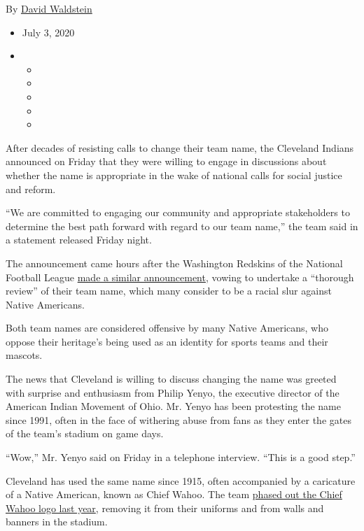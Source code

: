 By \href{https://www.nytimes.com/by/david-waldstein}{David Waldstein}

\begin{itemize}
\item
  July 3, 2020
\item
  \begin{itemize}
  \item
  \item
  \item
  \item
  \item
  \end{itemize}
\end{itemize}

After decades of resisting calls to change their team name, the
Cleveland Indians announced on Friday that they were willing to engage
in discussions about whether the name is appropriate in the wake of
national calls for social justice and reform.

``We are committed to engaging our community and appropriate
stakeholders to determine the best path forward with regard to our team
name,'' the team said in a statement released Friday night.

The announcement came hours after the Washington Redskins of the
National Football League
\href{https://www.nytimes.com/2020/07/03/sports/football/washington-redskins-nickname-nfl.html}{made
a similar announcement}, vowing to undertake a ``thorough review'' of
their team name, which many consider to be a racial slur against Native
Americans.

Both team names are considered offensive by many Native Americans, who
oppose their heritage's being used as an identity for sports teams and
their mascots.

The news that Cleveland is willing to discuss changing the name was
greeted with surprise and enthusiasm from Philip Yenyo, the executive
director of the American Indian Movement of Ohio. Mr. Yenyo has been
protesting the name since 1991, often in the face of withering abuse
from fans as they enter the gates of the team's stadium on game days.

``Wow,'' Mr. Yenyo said on Friday in a telephone interview. ``This is a
good step.''

Cleveland has used the same name since 1915, often accompanied by a
caricature of a Native American, known as Chief Wahoo. The team
\href{https://www.nytimes.com/2018/04/09/sports/baseball/cleveland-indians-chief-wahoo-protests.html}{phased
out the Chief Wahoo logo last year}, removing it from their uniforms and
from walls and banners in the stadium.

